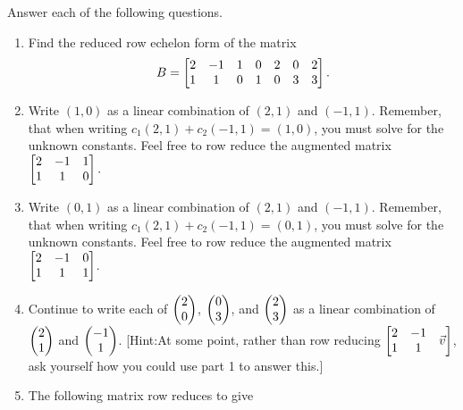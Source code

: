 \begin{problem*}[21, revised]
Answer each of the following questions.
\begin{enumerate}
\item Find the reduced row echelon form of the matrix
$$
B = 
\begin{bmatrix}
\begin{matrix} 2\\1 \end{matrix}&
\begin{matrix} -1\\1 \end{matrix}&
\begin{matrix} 1\\0 \end{matrix}&
\begin{matrix} 0\\1 \end{matrix}&
\begin{matrix} 2\\0 \end{matrix}&
\begin{matrix} 0\\3 \end{matrix}&
\begin{matrix} 2\\3 \end{matrix}
\end{bmatrix}.
$$
 \item Write $(1,0)$ as a linear combination of $(2, 1)$ and $(-1,1)$. Remember, that when writing $c_1(2,1)+c_2(-1,1)=(1,0)$, you must solve for the unknown constants. Feel free to row reduce the augmented matrix  
$\begin{bmatrix}
\begin{matrix} 2\\1 \end{matrix}&
\begin{matrix} -1\\1 \end{matrix}&
\begin{matrix} 1\\0 \end{matrix}
\end{bmatrix}.
$
 \item Write $(0,1)$ as a linear combination of $(2, 1)$ and $(-1,1)$. Remember, that when writing $c_1(2,1)+c_2(-1,1)=(0,1)$, you must solve for the unknown constants. Feel free to row reduce the augmented matrix  
$\begin{bmatrix}
\begin{matrix} 2\\1 \end{matrix}&
\begin{matrix} -1\\1 \end{matrix}&
\begin{matrix} 0\\1 \end{matrix}
\end{bmatrix}
$. 
 \item Continue to write each of $\begin{pmatrix} 2\\0 \end{pmatrix}$, $\begin{pmatrix} 0\\3 \end{pmatrix}$, and $\begin{pmatrix} 2\\3 \end{pmatrix}$ as a linear combination of $\begin{pmatrix} 2\\1 \end{pmatrix}$ and $\begin{pmatrix} -1\\1 \end{pmatrix}$. [Hint:At some point, rather than row reducing 
$\begin{bmatrix}
\begin{matrix} 2\\1 \end{matrix}&
\begin{matrix} -1\\1 \end{matrix}&
\vec v
\end{bmatrix}
$, ask yourself how you could use part 1 to answer this.]
\item The following matrix row reduces to give

\end{enumerate}
\end{problem*}
